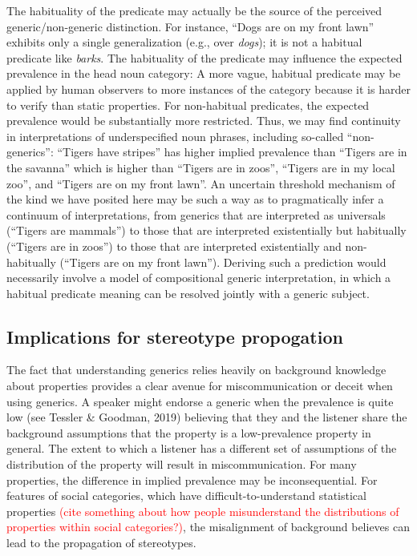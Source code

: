 \documentclass[floatsintext,doc]{apa6}
\begin{document}
The habituality of the predicate may actually be the source of the perceived generic/non-generic distinction.
For instance, \enquote{Dogs are on my front lawn} exhibits only a single generalization (e.g., over \emph{dogs}); it is not a habitual predicate like \emph{barks}.
The habituality of the predicate may influence the expected prevalence in the head noun category: A more vague, habitual predicate may be applied by human observers to more instances of the category because it is harder to verify than static properties.
For non-habitual predicates, the expected prevalence would be substantially more restricted.
Thus, we may find continuity in interpretations of underspecified noun phrases, including so-called \enquote{non-generics}: \enquote{Tigers have stripes} has higher implied prevalence than \enquote{Tigers are in the savanna} which is higher than \enquote{Tigers are in zoos}, \enquote{Tigers are in my local zoo}, and \enquote{Tigers are on my front lawn}.
An uncertain threshold mechanism of the kind we have posited here may be such a way as to pragmatically infer a continuum of interpretations, from generics that are interpreted as universals (\enquote{Tigers are mammals}) to those that are interpreted existentially but habitually (\enquote{Tigers are in zoos}) to those that are interpreted existentially and non-habitually (\enquote{Tigers are on my front lawn}).
Deriving such a prediction would necessarily involve a model of compositional generic interpretation, in which a habitual predicate meaning can be resolved jointly with a generic subject.

\hypertarget{implications-for-stereotype-propogation}{%
\subsection{Implications for stereotype propogation}\label{implications-for-stereotype-propogation}}

The fact that understanding generics relies heavily on background knowledge about properties provides a clear avenue for miscommunication or deceit when using generics.
A speaker might endorse a generic when the prevalence is quite low (see Tessler \& Goodman, 2019) believing that they and the listener share the background assumptions that the property is a low-prevalence property in general.
The extent to which a listener has a different set of assumptions of the distribution of the property will result in miscommunication.
For many properties, the difference in implied prevalence may be inconsequential.
For features of social categories, which have difficult-to-understand statistical properties {\textcolor{Red}{(cite something about how people misunderstand the distributions of properties within social categories?)}}, the misalignment of background believes can lead to the propagation of stereotypes.
\end{document}
